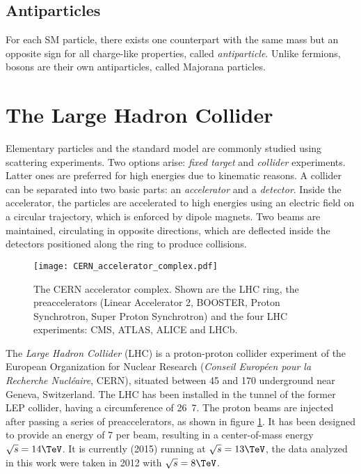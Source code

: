 \subsection{Antiparticles}
For each SM particle, there exists one counterpart with the same mass but an opposite sign for all charge-like properties, called \emph{antiparticle}. Unlike fermions, bosons are their own antiparticles, called Majorana particles.

\section{The Large Hadron Collider}
Elementary particles and the standard model are commonly studied using scattering experiments. Two options arise: \emph{fixed target} and \emph{collider} experiments. Latter ones are preferred for high energies due to kinematic reasons.
A collider can be separated into two basic parts: an \emph{accelerator} and a \emph{detector}.
Inside the accelerator, the particles are accelerated to high energies using an electric field on a circular trajectory, which is enforced by dipole magnets. Two beams are maintained, circulating in opposite directions, which are deflected inside the detectors positioned along the ring to produce collisions.

\begin{figure}[htbp]
	\centering
	\texttt{[image: CERN\_accelerator\_complex.pdf]}
	\caption{The CERN accelerator complex\cite[modified]{Marcastel2013CERNs}. Shown are the LHC ring, the preaccelerators (Linear Accelerator 2, BOOSTER, Proton Synchrotron, Super Proton Synchrotron) and the four LHC experiments: CMS, ATLAS, ALICE and LHCb.}
	\label{fig:cern_accelerator_complex}
\end{figure}

The \emph{Large Hadron Collider} (LHC) is a proton-proton collider experiment of the European Organization for Nuclear Research (\emph{Conseil Européen pour la Recherche Nucléaire}, CERN), situated between \unit{45}{\meter} and \unit{170}{\meter} underground near Geneva, Switzerland. The LHC has been installed in the tunnel of the former LEP collider, having a circumference of \unit{26.7}{\kilo\meter}\cite{BV2009CERN,EB2008LHC}. The proton beams are injected after passing a series of preaccelerators, as shown in figure \ref{fig:cern_accelerator_complex}. It has been designed to provide an energy of \unit{7}{\TeV} per beam, resulting in a center-of-mass energy $\sqrt{s} = \unit{14}{\TeV}$. It is currently (2015) running at $\sqrt{s} = \unit{13}{\TeV}$, the data analyzed in this work were taken in 2012 with $\sqrt{s} = \unit{8}{\TeV}$.

